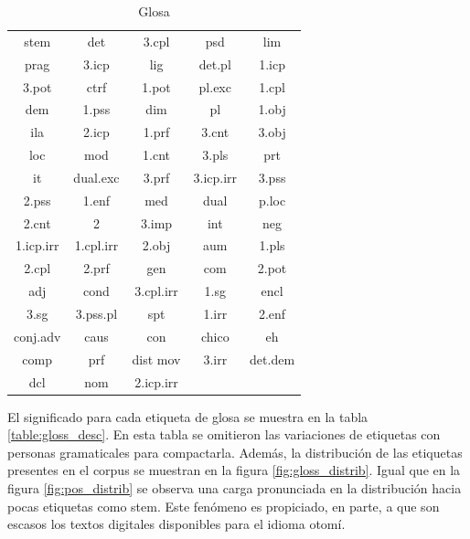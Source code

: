 \documentclass[letterpaper,12pt,oneside]{book}
\theoremstyle{definition}
\begin{document}
\begin{table}
	\centering
	\begin{tabular}{| c | c | c | c | c |}\hline
		 stem & det & 3.cpl & psd & lim \\
         prag & 3.icp & lig & det.pl & 1.icp \\
         3.pot & ctrf & 1.pot & pl.exc & 1.cpl \\
         dem & 1.pss & dim & pl & 1.obj \\
         ila & 2.icp & 1.prf & 3.cnt & 3.obj \\
         loc & mod & 1.cnt & 3.pls & prt \\
         it & dual.exc & 3.prf & 3.icp.irr & 3.pss \\
         2.pss & 1.enf & med & dual & p.loc \\
         2.cnt & 2 & 3.imp & int & neg \\
         1.icp.irr & 1.cpl.irr & 2.obj & aum & 1.pls \\
         2.cpl & 2.prf & gen & com & 2.pot\\
         adj & cond  & 3.cpl.irr & 1.sg & encl \\
         3.sg & 3.pss.pl & spt & 1.irr & 2.enf \\
         conj.adv & caus & con & chico & eh \\
         comp & prf & dist mov & 3.irr & det.dem\\
         dcl & nom & 2.icp.irr & & \\
		\hline
	\end{tabular}
	\caption{Glosa}
	\label{table:gloss_types}
\end{table}


El significado para cada etiqueta de glosa se muestra en la tabla \ref{table:gloss_desc}. En esta tabla se omitieron las variaciones de etiquetas con personas gramaticales para compactarla. Además, la distribución de las etiquetas presentes en el corpus se muestran en la figura \ref{fig:gloss_distrib}. Igual que en la figura \ref{fig:pos_distrib} se observa una carga pronunciada en la distribución hacia pocas etiquetas como \textsf{stem}. Este fenómeno es propiciado, en parte, a que son escasos los textos digitales disponibles para el idioma otomí.
\end{document}
